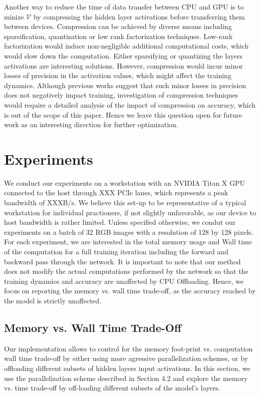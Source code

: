 \documentclass[11pt,onecolumn]{article}
\begin{document}
Another way to reduce the time of data transfer between CPU and GPU is to minize 
$\mathcal{V}$ by compressing the hidden layer activations 
before transferring them between devices.
Compression can be achieved by diverse means including sparsification, 
quantization or low rank factorization techniques.
Low-rank factorization would induce non-negligible additional computational costs, 
which would slow down the computation.
Either sparsifying or quantizing the layers activations are interesting solutions.
However, compression would incur minor losses of precision in the activation values,
which might affect the training dynamics.
Although previous works suggest that such minor losses in precision does not negatively impact training,
investigation of compression techniques would require a detailed analysis 
of the impact of compression on accuracy, which is out of the scope of this paper.
Hence we leave this question open for future work as an interesting direction for further optimization.

\section{Experiments}

We conduct our experiments on a workstation with an NVIDIA Titan X GPU connected 
to the host through XXX PCIe lanes, which represents a peak bandwidth of XXXB/s.
We believe this set-up to be representative of a typical workstation for individual practioners, 
if not slightly unfavorable, as our device to host bandwidth is rather limited.
Unless specified otherwise, we condut our experiments on a batch of 32 RGB images 
with a resolution of 128 by 128 pixels.
For each experiment, we are interested in the total memory usage and Wall time of
the computation for a full training iteration including the forward and backward pass through the network.
It is important to note that our method does not modify the actual computations performed
by the network so that the training dynamics and accuracy are unaffected by CPU Offloading.
Hence, we focus on reporting the memory vs. wall time trade-off,
 as the accuracy reached by the model is strictly unaffected.

\subsection{Memory vs. Wall Time Trade-Off}

Our implementation allows to control for the memory foot-print vs. computation wall time trade-off by 
either using more agressive parallelization schemes,
or by offloading different subsets of hidden layers input activations.
In this section, we use the parallelization scheme described in Section 4.2
and explore the memory vs. time trade-off by off-loading different subsets of the model's layers.
\end{document}
